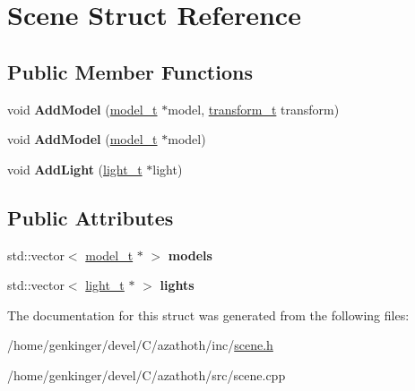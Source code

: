 \hypertarget{structScene}{}\section{Scene Struct Reference}
\label{structScene}
\subsection*{Public Member Functions}
\begin{DoxyCompactItemize}
\item 
\mbox{\label{structScene_a51955a8f6054d82bd9a7cbdd8b1ed33d}} 
void {\bfseries Add\+Model} (\mbox{\hyperlink{structmodel__t}{model\+\_\+t}} $\ast$model, \mbox{\hyperlink{structtransform__t}{transform\+\_\+t}} transform)
\item 
\mbox{\label{structScene_a7f89b07e8d3af153d8e76e03b916d423}} 
void {\bfseries Add\+Model} (\mbox{\hyperlink{structmodel__t}{model\+\_\+t}} $\ast$model)
\item 
\mbox{\label{structScene_af58a4baae38152b76776109bbd2f1f0b}} 
void {\bfseries Add\+Light} (\mbox{\hyperlink{structlight__t}{light\+\_\+t}} $\ast$light)
\end{DoxyCompactItemize}
\subsection*{Public Attributes}
\begin{DoxyCompactItemize}
\item 
\mbox{\label{structScene_a5ad25b28c449cdf1ec6eda9fe1a89248}} 
std\+::vector$<$ \mbox{\hyperlink{structmodel__t}{model\+\_\+t}} $\ast$ $>$ {\bfseries models}
\item 
\mbox{\label{structScene_a7bb65508062d98c228fa159c64b1d867}} 
std\+::vector$<$ \mbox{\hyperlink{structlight__t}{light\+\_\+t}} $\ast$ $>$ {\bfseries lights}
\end{DoxyCompactItemize}


The documentation for this struct was generated from the following files\+:\begin{DoxyCompactItemize}
\item 
/home/genkinger/devel/\+C/azathoth/inc/\mbox{\hyperlink{scene_8h}{scene.\+h}}\item 
/home/genkinger/devel/\+C/azathoth/src/scene.\+cpp\end{DoxyCompactItemize}
